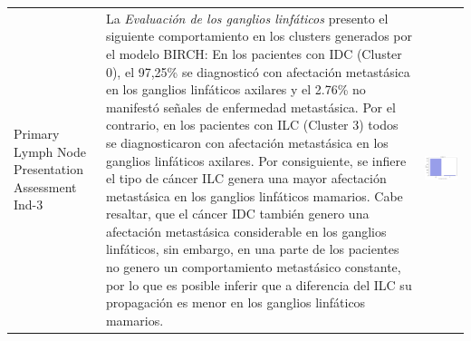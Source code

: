 \begin{table}[htb!]
	\footnotesize
	\begin{threeparttable}
		\begin{tabular}{p{2.5cm} p{7cm} p{6.5cm}} \toprule
			Primary Lymph Node Presentation Assessment Ind-3
			& La \textit{Evaluación de los ganglios linfáticos} presento el siguiente comportamiento en los clusters generados por el modelo BIRCH: En los pacientes con IDC (Cluster 0), el 97,25\% se diagnosticó con afectación metastásica en los ganglios linfáticos axilares y el 2.76\% no manifestó señales de enfermedad metastásica. Por el contrario, en los pacientes con ILC (Cluster 3) todos se diagnosticaron con afectación metastásica en los ganglios linfáticos axilares. Por consiguiente, se infiere el tipo de cáncer ILC genera una mayor afectación metastásica en los ganglios linfáticos mamarios. Cabe resaltar, que el cáncer IDC también genero una afectación metastásica considerable en los ganglios linfáticos, sin embargo, en una parte de los pacientes no genero un comportamiento metastásico constante, por lo que es posible inferir que a diferencia del ILC su propagación es menor en los ganglios linfáticos mamarios. 
			& 
			\begin{center}\includegraphics[width=1\linewidth]{NOTEBOOK/IMAGENES_BIRCH_CLUSTERING/6_Cluster_0_lymph_presentation}\end{center}

\end{tabular}
\end{threeparttable}
\end{table}
